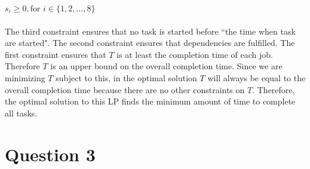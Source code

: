 \documentclass{article}
\begin{document}
$s_i \geq 0, \text{for } i \in \{1, 2,..., 8\}$
\\\\
The third constraint ensures that no task is started before ``the time when task are started". The second constraint ensures that dependencies are fulfilled. The first constraint ensures that $T$ is at least the completion time of each job. Therefore $T$ is an upper bound on the overall completion time. Since we are minimizing $T$ subject to this, in the optimal solution $T$ will always be equal to the overall completion time because there are no other constraints on $T$. Therefore, the optimal solution to this LP finds the minimum amount of time to complete all tasks.

\newpage
\section{Question 3}
\end{document}
